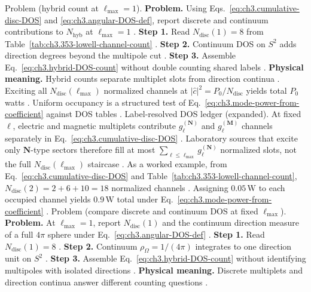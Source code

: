 Problem (hybrid count at \(\ell_{\max}=1\)). \textbf{Problem.} Using Eqs.~\eqref{eq:ch3.cumulative-disc-DOS} and \eqref{eq:ch3.angular-DOS-def}, report discrete and
continuum contributions to \(N_{\mathrm{hyb}}\) at \(\ell_{\max}=1\) \cite{harrington2001}.
\textbf{Step 1.} Read \(N_{\mathrm{disc}}(1)=8\) from Table~\ref{tab:ch3.353-lowell-channel-count} \cite{hansen1988}.
\textbf{Step 2.} Continuum DOS on \(S^{2}\) adds direction degrees beyond the multipole cut \cite{jackson1999}.
\textbf{Step 3.} Assemble Eq.~\eqref{eq:ch3.hybrid-DOS-count} without double counting shared labels \cite{harrington2001}.
\textbf{Physical meaning.} Hybrid counts separate multiplet slots from direction continua \cite{stratton1941}.
Exciting all \(N_{\mathrm{disc}}(\ell_{\max})\) normalized channels at \(|\widehat{c}|^{2}=P_{0}/N_{\mathrm{disc}}\) yields total
\(P_{0}\) watts \cite{harrington2001}. Uniform occupancy is a structured test of
Eq.~\eqref{eq:ch3.mode-power-from-coefficient} against DOS tables \cite{stratton1941}.
Label-resolved DOS ledger (expanded). At fixed \(\ell\), electric and magnetic multiplets contribute \(g_{\ell}^{(\mathbf{N})}\) and \(g_{\ell}^{(\mathbf{M})}\) channels
separately in Eq.~\eqref{eq:ch3.cumulative-disc-DOS} \cite{belinfante1940}. Laboratory sources that excite only
\(\mathbf{N}\)-type sectors therefore fill at most \(\sum_{\ell\le\ell_{\max}}g_{\ell}^{(\mathbf{N})}\) normalized slots, not the
full \(N_{\mathrm{disc}}(\ell_{\max})\) staircase \cite{stratton1941}.
As a worked example, from Eq.~\eqref{eq:ch3.cumulative-disc-DOS} and Table~\ref{tab:ch3.353-lowell-channel-count},
\(N_{\mathrm{disc}}(2)=2+6+10=18\) normalized channels \cite{hansen1988}. Assigning \(0.05\,\mathrm{W}\) to each occupied
channel yields \(0.9\,\mathrm{W}\) total under Eq.~\eqref{eq:ch3.mode-power-from-coefficient} \cite{poynting1884}.
Problem (compare discrete and continuum DOS at fixed \(\ell_{\max}\)). \textbf{Problem.} At \(\ell_{\max}=1\), report \(N_{\mathrm{disc}}(1)\) and the continuum direction measure of a full \(4\pi\) sphere
under Eq.~\eqref{eq:ch3.angular-DOS-def} \cite{jackson1999}.
\textbf{Step 1.} Read \(N_{\mathrm{disc}}(1)=8\) \cite{hansen1988}.
\textbf{Step 2.} Continuum \(\rho_{\Omega}=1/(4\pi)\) integrates to one direction unit on \(S^{2}\) \cite{jackson1999}.
\textbf{Step 3.} Assemble Eq.~\eqref{eq:ch3.hybrid-DOS-count} without identifying multipoles with isolated directions
\cite{harrington2001}.
\textbf{Physical meaning.} Discrete multiplets and direction continua answer different counting questions \cite{stratton1941}.
